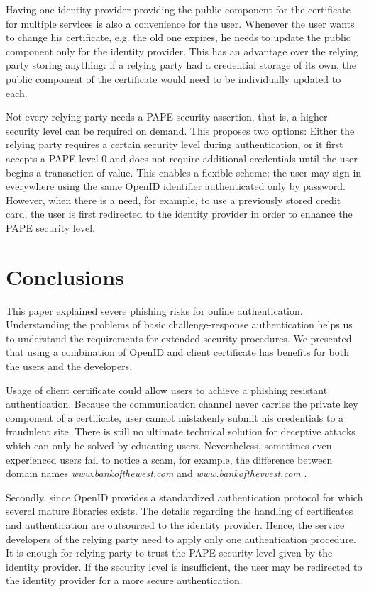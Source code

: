 \documentclass{tktltiki}
\begin{document}
      Having one identity provider providing the public component for the certificate for multiple services is also a convenience for the user. Whenever the user wants to change his certificate, e.g. the old one expires, he needs to update the public component only for the identity provider. This has an advantage over the relying party storing anything: if a relying party had a credential storage of its own, the public component of the certificate would need to be individually updated to each.

      Not every relying party needs a PAPE security assertion, that is, a higher security level can be required on demand. This proposes two options: Either the relying party requires a certain security level during authentication, or it first accepts a PAPE level 0 and does not require additional credentials until the user begins a transaction of value. This enables a flexible scheme: the user may sign in everywhere using the same OpenID identifier authenticated only by password. However, when there is a need, for example, to use a previously stored credit card, the user is first redirected to the identity provider in order to enhance the PAPE security level.
      

\section{Conclusions}

      This paper explained severe phishing risks for online authentication. Understanding the problems of basic challenge-response authentication helps us to understand the requirements for extended security procedures. We presented that using a combination of OpenID and client certificate has benefits for both the users and the developers.
      
      Usage of client certificate could allow users to achieve a phishing resistant authentication. Because the communication channel never carries the private key component of a certificate, user cannot mistakenly submit his credentials to a fraudulent site. There is still no ultimate technical solution for deceptive attacks which can only be solved by educating users. Nevertheless, sometimes even experienced users fail to notice a scam, for example, the difference between domain names 
\emph{www.bankofthewest.com} and \emph{www.bankofthevvest.com} \cite{why_phishing_works_06}.
      
      Secondly, since OpenID provides a standardized authentication protocol for which several mature libraries exists. The details regarding the handling of certificates and authentication are outsourced to the identity provider. Hence, the service developers of the relying party need to apply only one authentication procedure. It is enough for relying party to trust the PAPE security level given by the identity provider. If the security level is insufficient, the user may be redirected to the identity provider for a more secure authentication.
      
\end{document}
